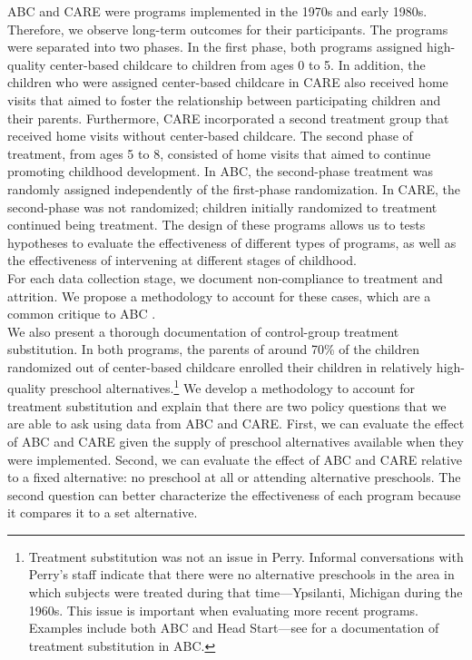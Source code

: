 \noindent ABC and CARE were programs implemented in the 1970s and early 1980s. Therefore, we observe long-term outcomes for their participants. The programs were separated into two phases. In the first phase, both programs assigned high-quality center-based childcare to children from ages 0 to 5. In addition, the children who were assigned center-based childcare in CARE also received home visits that aimed to foster the relationship between participating children and their parents. Furthermore, CARE incorporated a second treatment group that received home visits without center-based childcare. The second phase of treatment, from ages 5 to 8, consisted of home visits that aimed to continue promoting childhood development. In ABC, the second-phase treatment was randomly assigned independently of the first-phase randomization. In CARE, the second-phase was not randomized; children initially randomized to treatment continued being treatment. The design of these programs allows us to tests hypotheses to evaluate the effectiveness of different types of programs, as well as the effectiveness of intervening at different stages of childhood.\\

\noindent For each data collection stage, we document non-compliance to treatment and attrition. We propose a methodology to account for these cases, which are a common critique to ABC \citep{Spitz_1992_ABC-Retardation,Hu_2014_ABC-Study}.\\

\noindent We also present a thorough documentation of control-group treatment substitution. In both programs, the parents of around 70\% of the children randomized out of center-based childcare enrolled their children in relatively high-quality preschool alternatives.\footnote{Treatment substitution was not an issue in Perry. Informal conversations with Perry's staff indicate that there were no alternative preschools in the area in which subjects were treated during that time---Ypsilanti, Michigan during the 1960s. This issue is important when evaluating more recent programs. Examples include both ABC and Head Start---see \citep{Puma_Bell_etal_2010_HeadStartImpact} for a documentation of treatment substitution in ABC.} We develop a methodology to account for treatment substitution and explain that there are two policy questions that we are able to ask using data from ABC and CARE. First, we can evaluate the effect of ABC and CARE given the supply of preschool alternatives available when they were implemented. Second, we can evaluate the effect of ABC and CARE relative to a fixed alternative: no preschool at all or attending alternative preschools. The second question can better characterize the effectiveness of each program because it compares it to a set alternative.\\

